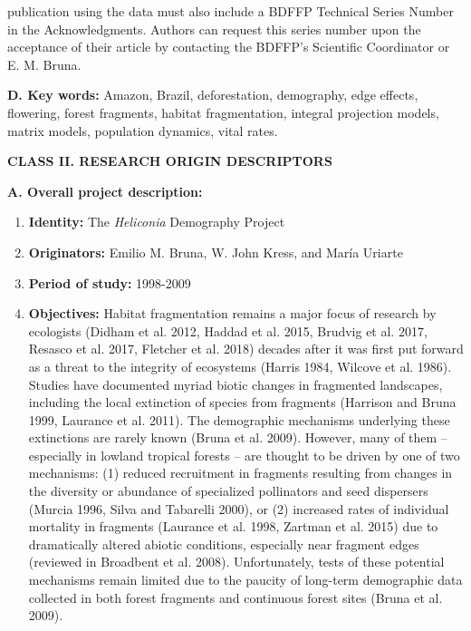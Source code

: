 \documentclass[
  man, donotrepeattitle,floatsintext]{apa6}
\begin{document}
\begin{enumerate}
publication using the data must also include a BDFFP Technical Series Number in the Acknowledgments. Authors can request this series number upon the acceptance of their article by contacting the BDFFP's Scientific Coordinator or E. M. Bruna.
\end{enumerate}

\noindent
\textbf{D. Key words:} Amazon, Brazil, deforestation, demography, edge effects, flowering, forest fragments, habitat fragmentation, integral projection models, matrix models, population dynamics, vital rates.

\noindent 
\textbf{CLASS II. RESEARCH ORIGIN DESCRIPTORS}

\noindent  
\textbf{A. Overall project description:}

\begin{enumerate}
\def\labelenumi{\arabic{enumi}.}
\item
  \textbf{Identity:} The \emph{Heliconia} Demography Project
\item
  \textbf{Originators:} Emilio M. Bruna, W. John Kress, and María Uriarte
\item
  \textbf{Period of study:} 1998-2009
\item
  \textbf{Objectives:} Habitat fragmentation remains a major focus of research by ecologists (Didham et al. 2012, Haddad et al. 2015, Brudvig et al. 2017, Resasco et al. 2017, Fletcher et al. 2018) decades after it was first put forward as a threat to the integrity of ecosystems (Harris 1984, Wilcove et al. 1986). Studies have documented myriad biotic changes in fragmented landscapes, including the local extinction of species from fragments (Harrison and Bruna 1999, Laurance et al. 2011). The demographic mechanisms underlying these extinctions are rarely known (Bruna et al. 2009). However, many of them -- especially in lowland tropical forests -- are thought to be driven by one of two mechanisms: (1) reduced recruitment in fragments resulting from changes in the diversity or abundance of specialized pollinators and seed dispersers (Murcia 1996, Silva and Tabarelli 2000), or (2) increased rates of individual mortality in fragments (Laurance et al. 1998, Zartman et al. 2015) due to dramatically altered abiotic conditions, especially near fragment edges (reviewed in Broadbent et al. 2008). Unfortunately, tests of these potential mechanisms remain limited due to the paucity of long-term demographic data collected in both forest fragments and continuous forest sites (Bruna et al. 2009).
\end{enumerate}
\end{document}
